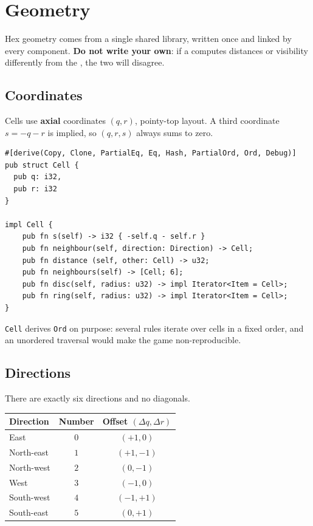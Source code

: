 \documentclass{article}
\begin{document}
\newpage
\section{Geometry}
\label{proto:geometry}

Hex geometry comes from a single shared library, written once and linked by every component. \textbf{Do not write your own}: if a \ship{} computes distances or visibility differently from the \chart{}, the two will disagree.

\subsection{Coordinates}
\label{proto:coords}

Cells use \textbf{axial} coordinates $(q, r)$, pointy-top layout. A third coordinate $s = -q - r$ is implied, so $(q, r, s)$ always sums to zero.

\begin{lstlisting}
#[derive(Copy, Clone, PartialEq, Eq, Hash, PartialOrd, Ord, Debug)]
pub struct Cell {
  pub q: i32,
  pub r: i32
}

impl Cell {
    pub fn s(self) -> i32 { -self.q - self.r }
    pub fn neighbour(self, direction: Direction) -> Cell;
    pub fn distance (self, other: Cell) -> u32;
    pub fn neighbours(self) -> [Cell; 6];
    pub fn disc(self, radius: u32) -> impl Iterator<Item = Cell>;
    pub fn ring(self, radius: u32) -> impl Iterator<Item = Cell>;
}
\end{lstlisting}

\texttt{Cell} derives \texttt{Ord} on purpose: several rules iterate over cells in a fixed order, and an unordered traversal would make the game non-reproducible.

\subsection{Directions}
\label{proto:directions}

There are exactly six directions and no diagonals.

\begin{center}
\begin{tabular}{|l|c|c|}
 \hline
 {\bf Direction} & {\bf Number} & {\bf Offset $(\Delta q, \Delta r)$} \\
 \hline\hline
 East & $0$ & $(+1, 0)$ \\
 \hline
 North-east & $1$ & $(+1, -1)$ \\
 \hline
 North-west & $2$ & $(0, -1)$ \\
 \hline
 West & $3$ & $(-1, 0)$ \\
 \hline
 South-west & $4$ & $(-1, +1)$ \\
 \hline
 South-east & $5$ & $(0, +1)$ \\
 \hline
\end{tabular}
\end{center}
\end{document}
